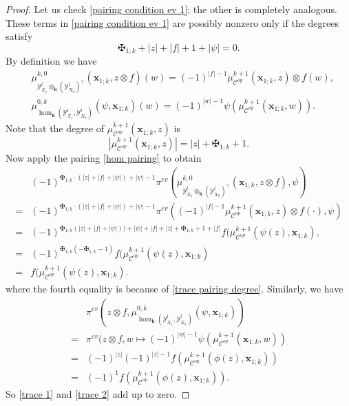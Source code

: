 \documentclass[10pt,a4paper]{amsart}
\def\K{{\mathbf{k}}}
\def\Y{\mathcal{Y}}
\def\cc{\mathcal{C}}
\begin{document}
\begin{proof}
Let us check \eqref{pairing condition ev 1}; the other is completely analogous. 
These terms in \eqref{pairing condition ev 1} are possibly nonzero only if the degrees satisfy
\begin{equation}\label{trace pairing degree}
\maltese_{1;k} + |z| + |f| + 1 + |\psi| = 0.
\end{equation}
By definition we have
\begin{align}
& \mu_{\Y^{l}_{X_{1}} \otimes_{\K} (\Y^{l}_{X_{0}})^{\vee}}^{k, 0}(\mathbf{x}_{1;k}, z \otimes f)(w) = (-1)^{|f| - 1} \mu^{k+1}_{\cc^{op}}(\mathbf{x}_{1;k}, z) \otimes f(w), \\
& \mu_{\hom_{\K}(\Y^{l}_{X_{1}}, \Y^{l}_{X_{0}})}^{0, k}(\psi, \mathbf{x}_{1;k})(w) = (-1)^{|w|-1} \psi(\mu^{k+1}_{\cc^{op}}(\mathbf{x}_{1;k}, w)).
\end{align}
Note that the degree of $\mu^{k+1}_{\cc^{op}}(\mathbf{x}_{1;k}, z)$ is
\begin{equation}
|\mu^{k+1}_{\cc^{op}}(\mathbf{x}_{1;k}, z)| = |z| + \maltese_{1;k} + 1.
\end{equation}
Now apply the pairing \eqref{hom pairing} to obtain
\begin{equation}\label{trace 1}
\begin{split}
& (-1)^{\maltese_{1;k} \cdot (|z|+|f|+|\psi|) + |\psi| - 1} \pi^{ev}(\mu_{\Y^{l}_{X_{1}} \otimes_{\K} (\Y^{l}_{X_{0}})^{\vee}}^{k, 0}(\mathbf{x}_{1;k}, z \otimes f), \psi) \\
= & (-1)^{\maltese_{1;k} \cdot (|z|+|f|+|\psi|) + |\psi| - 1} \pi^{ev}((-1)^{|f| - 1} \mu^{k+1}_{\cc^{op}}(\mathbf{x}_{1;k}, z) \otimes f(\cdot), \psi) \\
= & (-1)^{\maltese_{1;k}(|z|+|f|+|\psi|)) + |\psi| + |f| + |z| + \maltese_{1;k} + 1 + |f|} f(\mu_{\cc^{op}}^{k+1}(\psi(z), \mathbf{x}_{1;k}),\\
= & (-1)^{\maltese_{1;k}(-\maltese_{1;k} - 1)} f(\mu_{\cc^{op}}^{k+1}(\psi(z), \mathbf{x}_{1;k}) \\
=  & f(\mu_{\cc^{op}}^{k+1}(\psi(z), \mathbf{x}_{1;k}).
\end{split}
\end{equation}
where the fourth equality is because of \eqref{trace pairing degree}.
Similarly, we have
\begin{equation}\label{trace 2}
\begin{split}
& \pi^{ev}(z \otimes f, \mu_{\hom_{\K}(\Y^{l}_{X_{1}}, \Y^{l}_{X_{0}})}^{0, k}(\psi, \mathbf{x}_{1;k})) \\
= &  \pi^{ev}(z \otimes f, w \mapsto (-1)^{|w|-1} \psi(\mu^{k+1}_{\cc^{op}}(\mathbf{x}_{1;k}, w))  \\
= & (-1)^{|z| } (-1)^{|z|-1} f(\mu_{\cc^{op}}^{k+1}(\phi(z), \mathbf{x}_{1;k})) \\
= & (-1)^{ 1} f(\mu_{\cc^{op}}^{k+1}(\phi(z), \mathbf{x}_{1;k})).
 \end{split}
\end{equation}
So \eqref{trace 1} and \eqref{trace 2} add up to zero.


\end{proof}
\end{document}
